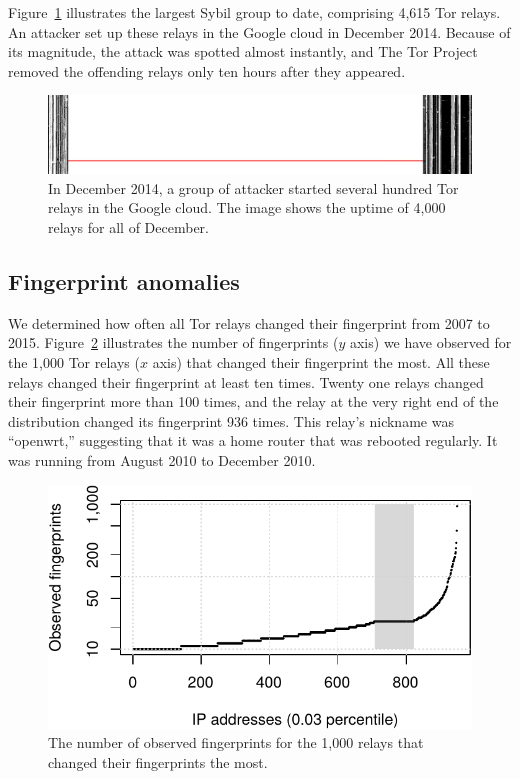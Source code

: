 Figure~\ref{fig:2014-12-lizard} illustrates the largest Sybil group to date,
comprising 4,615 Tor relays.  An attacker set up these relays in the Google
cloud in December 2014.  Because of its magnitude, the attack was spotted
almost instantly, and The Tor Project removed the offending relays only ten
hours after they appeared.

\begin{figure}[t]
	\centering
	\includegraphics[width=\linewidth]{diagrams/2014-12.jpg}
	\caption{In December 2014, a group of attacker started several hundred Tor
		relays in the Google cloud.  The image shows the uptime of 4,000 relays
		for all of December.}
	\label{fig:2014-12-lizard}
\end{figure}

\subsection{Fingerprint anomalies}
\label{sec:fingerprints}
We determined how often all Tor relays changed their fingerprint from 2007 to
2015.  Figure~\ref{fig:fingerprints} illustrates the number of fingerprints ($y$
axis) we have observed for the 1,000 Tor relays ($x$ axis) that changed their
fingerprint the most.  All these relays changed their fingerprint at least ten
times.  Twenty one relays changed their fingerprint more than 100 times, and the
relay at the very right end of the distribution changed its fingerprint 936
times.  This relay's nickname was ``openwrt,'' suggesting that it was a home
router that was rebooted regularly.  It was running from August 2010 to December
2010.

\begin{figure}[t]
	\centering
	\includegraphics[width=0.9\linewidth]{diagrams/fingerprints.pdf}
	\caption{The number of observed fingerprints for the 1,000 relays that
	changed their fingerprints the most.}
	\label{fig:fingerprints}
\end{figure}

